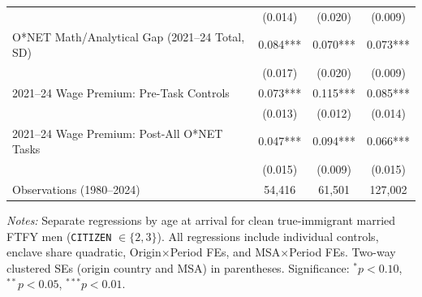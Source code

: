 \begin{table}[t!]
{\begin{tabular}{lccc}
 & (0.014) & (0.020) & (0.009) \\
O*NET Math/Analytical Gap (2021--24 Total, SD) & 0.084*** & 0.070*** & 0.073*** \\
 & (0.017) & (0.020) & (0.009) \\
2021--24 Wage Premium: Pre-Task Controls & 0.073*** & 0.115*** & 0.085*** \\
 & (0.013) & (0.012) & (0.014) \\
2021--24 Wage Premium: Post-All O*NET Tasks & 0.047*** & 0.094*** & 0.066*** \\
 & (0.015) & (0.009) & (0.015) \\
\midrule
Observations (1980--2024) & 54,416 & 61,501 & 127,002 \\
\bottomrule
\end{tabular}%
}
\begin{minipage}{0.95\textwidth}\vspace{2pt}\scriptsize
\textit{Notes:} Separate regressions by age at arrival for clean true-immigrant married FTFY men (\texttt{CITIZEN} $\in \{2,3\}$). All regressions include individual controls, enclave share quadratic, Origin$\times$Period FEs, and MSA$\times$Period FEs. Two-way clustered SEs (origin country and MSA) in parentheses. Significance: $^{*} p<0.10$, $^{**} p<0.05$, $^{***} p<0.01$.
\end{minipage}
\end{table}